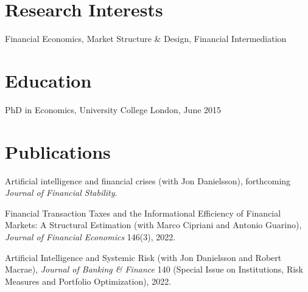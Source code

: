 \documentclass[margin,line, 11pt]{res}
\newenvironment{list1}{
  \begin{list}{\ding{113}}{%
      \setlength{\itemsep}{0in}
      \setlength{\parsep}{0in} \setlength{\parskip}{0in}
      \setlength{\topsep}{0in} \setlength{\partopsep}{0in} 
      \setlength{\leftmargin}{0.17in}}}{\end{list}}
\begin{document}
\begin{resume}
\section{\sc Research Interests}
\begin{list1}
\item[] Financial Economics, Market Structure \& Design, Financial Intermediation
\end{list1}

\section{\sc Education}

\begin{list1}
\item[] PhD in Economics, University College London, June 2015
\vspace*{0.2cm}

\end{list1}

\section{\sc Publications}
\begin{list1}
\item[] Artificial intelligence and financial crises (with Jon Danielsson), forthcoming \textit{Journal of Financial Stability}.
\vspace*{0.2cm}
\item[] Financial Transaction Taxes and the Informational Efficiency of Financial Markets: A Structural Estimation (with Marco Cipriani and Antonio Guarino), \textit{Journal of Financial Economics} 146(3), 2022.
\vspace*{0.2cm}
\item[] Artificial Intelligence and Systemic Risk (with Jon Danielsson and Robert Macrae), \textit{Journal of Banking \& Finance} 140 (Special Issue on Institutions, Risk Measures and Portfolio Optimization), 2022.
\end{list1}


\end{resume}
\end{document}
